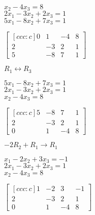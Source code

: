 \documentclass[letterpaper,12pt,fleqn]{article}
\begin{document}
\begin{example}
  \begin{minipage}[t]{2in}
    \vspace{0pt}
    $x_2-4x_3=8$ \\
    $2x_1-3x_2+2x_3=1$ \\
    $5x_1-8x_2+7x_3=1$
  \end{minipage}
  \begin{minipage}[t]{2in}
    \vspace{0pt}
    $\begin{bmatrix}[ccc:c]
      0 & 1 &-4 & 8 \\
      2 & -3 & 2 & 1 \\
      5 & -8 & 7 & 1
    \end{bmatrix}$
  \end{minipage}

  \bigskip

  $R_1\leftrightarrow R_3$

  \begin{minipage}[t]{2in}
    \vspace{0pt}
    $5x_1-8x_2+7x_3=1$ \\
    $2x_1-3x_2+2x_3=1$ \\
    $x_2-4x_3=8$
  \end{minipage}
  \begin{minipage}[t]{2in}
    \vspace{0pt}
    $\begin{bmatrix}[ccc:c]
      5 & -8 & 7 & 1 \\
      2 & -3 & 2 & 1 \\
      0 & 1 &-4 & 8
    \end{bmatrix}$
  \end{minipage}

  \bigskip

  $-2R_2+R_1\rightarrow R_1$

  \begin{minipage}[t]{2in}
    \vspace{0pt}
    $x_1-2x_2+3x_3=-1$ \\
    $2x_1-3x_2+2x_3=1$ \\
    $x_2-4x_3=8$
  \end{minipage}
  \begin{minipage}[t]{2in}
    \vspace{0pt}
    $\begin{bmatrix}[ccc:c]
      1 & -2 & 3 & -1 \\
      2 & -3 & 2 & 1 \\
      0 & 1 &-4 & 8
    \end{bmatrix}$
  \end{minipage}


\end{example}
\end{document}
